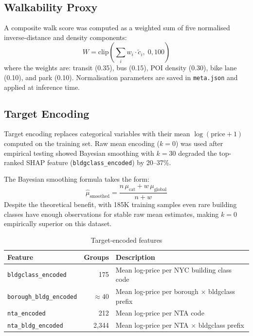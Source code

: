 \documentclass[11pt, a4paper, twoside]{article}
\begin{document}
\subsection{Walkability Proxy}
A composite walk score was computed as a weighted sum of five normalised
inverse-distance and density components:
\begin{equation}
  W = \text{clip}\!\left(
    \sum_{i} w_i \cdot \tilde{c}_i,\; 0, 100
  \right)
  \label{eq:walk_score}
\end{equation}
where the weights are: transit (0.35), bus (0.15), POI density (0.30), bike
lane (0.10), and park (0.10). Normalisation parameters are saved in
\texttt{meta.json} and applied at inference time.

\subsection{Target Encoding}
Target encoding replaces categorical variables with their mean $\log(\text{price}+1)$
computed on the training set. Raw mean encoding ($k=0$) was used after
empirical testing showed Bayesian smoothing with $k=30$ degraded the top-ranked
SHAP feature (\texttt{bldgclass\_encoded}) by 20--37\%.

The Bayesian smoothing formula takes the form:
\begin{equation}
  \hat{\mu}_{\text{smoothed}} = \frac{n\,\mu_{\text{cat}} + w\,\mu_{\text{global}}}{n + w}
  \label{eq:bayes_smooth}
\end{equation}
Despite the theoretical benefit, with 185K training samples even rare building
classes have enough observations for stable raw mean estimates, making $k=0$
empirically superior on this dataset.

\begin{table}[H]
  \centering
  \caption{Target-encoded features}
  \label{tab:encoding}
  \begin{tabular}{lrl}
    \toprule
    Feature & Groups & Description \\
    \midrule
    \texttt{bldgclass\_encoded}    & 175   & Mean log-price per NYC building class code \\
    \texttt{borough\_bldg\_encoded}& $\approx 40$ & Mean log-price per borough $\times$ bldgclass prefix \\
    \texttt{nta\_encoded}          & 212   & Mean log-price per NTA code \\
    \texttt{nta\_bldg\_encoded}    & 2,344 & Mean log-price per NTA $\times$ bldgclass prefix \\
    \bottomrule
  \end{tabular}
\end{table}
\end{document}
